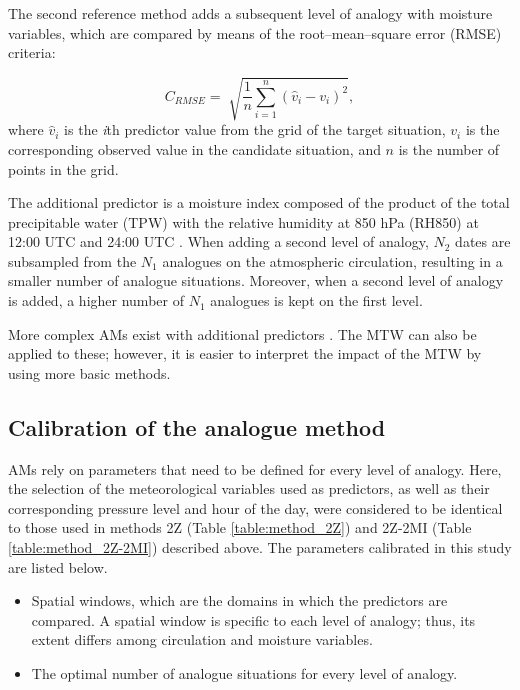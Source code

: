 \documentclass[hess, manuscript]{copernicus}
\providecommand{\DIFadd}[1]{{\protect\color{blue}\uwave{#1}}} %
\providecommand{\DIFaddbegin}{} %
\providecommand{\DIFaddend}{} %
\begin{document}
	The second reference method \citep[2Z-2MI, Table \ref{table:method_2Z-2MI};][]{Bontron2005} adds a subsequent level of analogy with moisture variables, which are compared by means of the root--mean--square error (RMSE) criteria:

	\begin{equation}
	\label{eq:RMSE}
	C_{RMSE}= \sqrt[]{ \frac{1}{n} \sum_{i=1}^{n}(\hat{v}_{i} - v_{i})^{2}} ,
	\end{equation}
	where $\hat{v}_{i}$ is the \textit{i}th predictor value from the grid of the target situation, $v_{i}$ is the corresponding observed value in the candidate situation, and $n$ is the number of points in the grid.

	The additional predictor is a moisture index \DIFaddbegin \DIFadd{(MI) }\DIFaddend composed of the product of the total precipitable water (TPW) with the relative humidity at 850 hPa (RH850) at 12:00 \DIFaddbegin \DIFadd{h }\DIFaddend UTC and 24:00 \DIFaddbegin \DIFadd{h }\DIFaddend UTC \citep{Bontron2004}. When adding a second level of analogy, $N_{2}$ dates are subsampled from the $N_{1}$ analogues on the atmospheric circulation, resulting in a smaller number of analogue situations. Moreover, when a second level of analogy is added, a higher number of $N_{1}$ analogues is kept on the first level.

	More complex AMs exist with additional predictors \citep[e.g.][]{Horton2012a, BenDaoud2016, Caillouet2016}. The MTW can also be applied to these; however, it is easier to interpret the impact of the MTW by using more basic methods.

	
	\subsection{Calibration of the analogue method}
	\label{sec:calibration}

	AMs rely on parameters that need to be defined for every level of analogy. Here, the selection of the meteorological variables used as predictors, as well as their corresponding pressure level and hour of the day, were considered to be identical to those used in methods 2Z (Table \ref{table:method_2Z}) and 2Z-2MI (Table \ref{table:method_2Z-2MI}) described above. The parameters calibrated in this study are listed below.

	\begin{itemize}
		\item Spatial windows, which are the domains in which the predictors are compared. A spatial window is specific to each level of analogy; thus, its extent differs among circulation and moisture variables.
		\item The optimal number of analogue situations for every level of analogy.
	\end{itemize}
\end{document}
